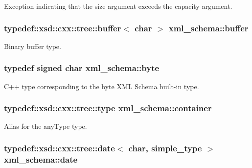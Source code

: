 Exception indicating that the size argument exceeds the capacity argument. 

\hypertarget{namespacexml__schema_a3a1af5d598f84fcd6707cc9f84880533}{
\subsubsection[{buffer}]{\setlength{\rightskip}{0pt plus 5cm}typedef\-::xsd\-::cxx\-::tree\-::buffer$<$ char $>$ {\bf xml\-\_\-schema\-::buffer}}}\label{namespacexml__schema_a3a1af5d598f84fcd6707cc9f84880533}


Binary buffer type. 

\hypertarget{namespacexml__schema_a2a462724b41fb68016d13b34f9a84b7d}{
\subsubsection[{byte}]{\setlength{\rightskip}{0pt plus 5cm}typedef signed char {\bf xml\-\_\-schema\-::byte}}}\label{namespacexml__schema_a2a462724b41fb68016d13b34f9a84b7d}


C++ type corresponding to the byte X\-M\-L Schema built-\/in type. 

\hypertarget{namespacexml__schema_ada9aa30dc722e93ee2ed7243085402a5}{
\subsubsection[{container}]{\setlength{\rightskip}{0pt plus 5cm}typedef\-::xsd\-::cxx\-::tree\-::type {\bf xml\-\_\-schema\-::container}}}\label{namespacexml__schema_ada9aa30dc722e93ee2ed7243085402a5}


Alias for the any\-Type type. 

\hypertarget{namespacexml__schema_abc702b2b5f66618b0fdbbbe484492b4d}{
\subsubsection[{date}]{\setlength{\rightskip}{0pt plus 5cm}typedef\-::xsd\-::cxx\-::tree\-::date$<$ char, {\bf simple\-\_\-type} $>$ {\bf xml\-\_\-schema\-::date}}}\label{namespacexml__schema_abc702b2b5f66618b0fdbbbe484492b4d}


